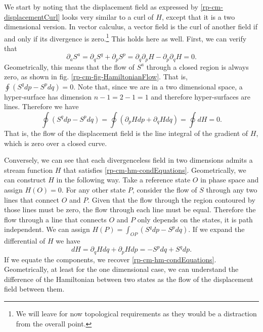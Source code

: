 We start by noting that the displacement field as expressed by \ref{rp-cm-displacementCurl} looks very similar to a curl of $H$, except that it is a two dimensional version. In vector calculus, a vector field is the curl of another field if and only if its divergence is zero.\footnote{We will leave for now topological requirements as they would be a distraction from the overall point.} This holds here as well. First, we can verify that
\begin{equation}
	\partial_a S^a = \partial_q S^q + \partial_p S^p = \partial_q \partial_p H - \partial_p \partial_q H = 0.
\end{equation}
Geometrically, this means that the flow of $S^a$ through a closed region is always zero, as shown in fig. \ref{rp-cm-fig-HamiltonianFlow}. That is, $\oint \left( S^q dp - S^p dq \right) = 0$. Note that, since we are in a two dimensional space, a hyper-surface has dimension $n-1 = 2-1 = 1$ and therefore hyper-surfaces are lines. Therefore we have 
\begin{equation}
	\oint \left( S^q dp - S^p dq \right) = \oint \left( \partial_p H dp + \partial_q H dq \right) = \oint dH = 0.
\end{equation}
That is, the flow of the displacement field is the line integral of the gradient of $H$, which is zero over a closed curve.

Conversely, we can see that each divergenceless field in two dimensions admits a stream function $H$ that satisfies \ref{rp-cm-hm-condEquations}. Geometrically, we can construct $H$ in the following way. Take a reference state $O$ in phase space and assign $H(O) = 0$. For any other state $P$, consider the flow of $S$ through any two lines that connect $O$ and $P$. Given that the flow through the region contoured by those lines must be zero, the flow through each line must be equal. Therefore the flow through a line that connects $O$ and $P$ only depends on the states, it is path independent. We can assign $H(P) = \int_{OP} \left( S^q dp - S^p dq \right)$. If we expand the differential of $H$ we have
\begin{equation}
	dH = \partial_q H dq + \partial_p H dp = - S^p dq + S^q dp.
\end{equation}
If we equate the components, we recover \ref{rp-cm-hm-condEquations}. Geometrically, at least for the one dimensional case, we can understand the difference of the Hamiltonian between two states as the flow of the displacement field between them.

